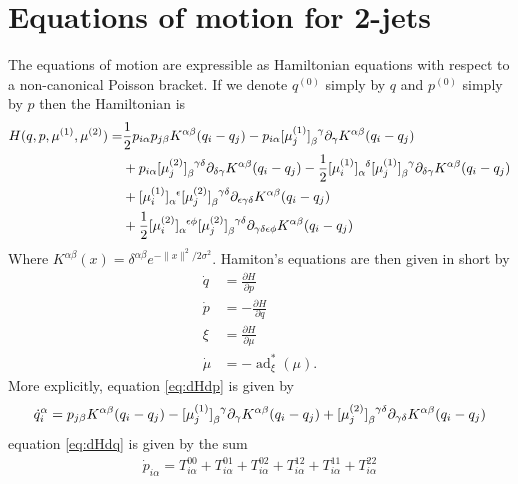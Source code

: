 \documentclass[12pt]{amsart}
\DeclareMathOperator{\ad}{ad}
\begin{document}
\section{Equations of motion for 2-jets}
\label{sec:eom}
The equations of motion are expressible as Hamiltonian
equations with respect to a non-canonical Poisson bracket.
If we denote $q^{(0)}$ simply by $q$ and $p^{(0)}$ simply
by $p$ then the Hamiltonian is
\begin{align*}
  H(q,p,\mu^{(1)},\mu^{(2)}) =& \frac{1}{2} p_{i \alpha} p_{j \beta}
  K^{\alpha \beta}(q_i - q_j) - p_{i \alpha} [\mu^{(1)}_j]
  \indices{_{\beta}^{\gamma}} \partial_\gamma K^{\alpha \beta}( q_i -
  q_j) \\
  &+ p_{i \alpha} [\mu^{(2)}_j] \indices{_\beta^{\gamma
      \delta}} \partial_{\delta \gamma}K^{\alpha \beta}( q_i - q_j) -
  \frac{1}{2} [\mu_i^{(1)}] \indices{_{\alpha}^\delta} [\mu_j^{(1)} ]
  \indices{_\beta^\gamma} \partial_{\delta \gamma} K^{\alpha
    \beta}(q_i -q_j) \\
  &+ [\mu_i^{(1)}]\indices{_\alpha^\epsilon} [\mu_j^{(2)}]
  \indices{_\beta^{\gamma \delta}} \partial_{\epsilon \gamma \delta}
  K^{\alpha \beta}( q_i - q_j) \\
  &+ \frac{1}{2}
  [\mu_i^{(2)}]\indices{_\alpha^{\epsilon \phi}} [\mu_j^{(2)}]
  \indices{_\beta^{\gamma \delta} } \partial_{\gamma \delta \epsilon
    \phi} K^{\alpha \beta}( q_i - q_j )
\end{align*}
Where $K^{\alpha \beta}(x) = \delta^{\alpha \beta} e^{- \| x \|^2 / 2 \sigma^2}$.
Hamiton's equations are then given in short by
\begin{align}
  \dot{q} &= \frac{ \partial H}{\partial p} \label{eq:dHdp} \\
  \dot{p} &= - \frac{ \partial H}{\partial q} \label{eq:dHdq} \\
  \xi &= \frac{\partial H}{\partial \mu} \label{eq:dHdmu} \\
  \dot{\mu} &= - \ad^*_{ \xi } ( \mu ) . \label{eq:LiePoisson} 
\end{align}
More explicitly, equation \eqref{eq:dHdp} is given by
\begin{align*}
  \dot{q}_i^\alpha = p_{j \beta} K^{\alpha \beta}( q_i - q_j) -
  [\mu^{(1)}_j] \indices{_\beta^\gamma} \partial_\gamma K^{\alpha
    \beta}(q_i - q_j) + [\mu^{(2)}_j] \indices{_\beta^{\gamma
      \delta}} \partial_{\gamma \delta} K^{\alpha \beta}(q_i - q_j)
\end{align*}
equation \eqref{eq:dHdq} is given by the sum
\begin{align*}
  \dot{p}_{i\alpha} = T^{00}_{i\alpha} + T^{01}_{i\alpha} +
  T^{02}_{i\alpha} + T^{12}_{i\alpha} + T^{11}_{i\alpha} + T^{22}_{i\alpha}
\end{align*}
\end{document}
